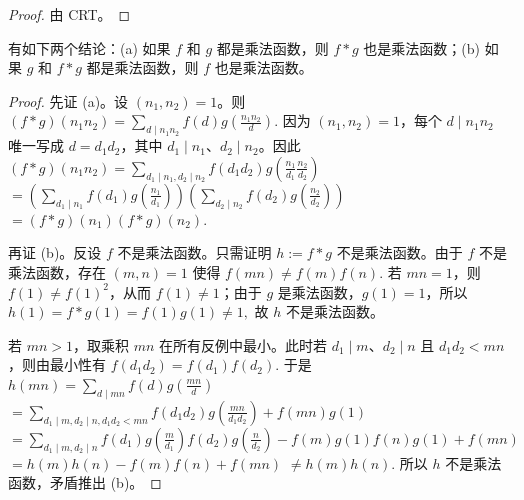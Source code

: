 \begin{proof}
	由 CRT。
\end{proof}



\begin{theorem}
	有如下两个结论：(a) 如果 $f$ 和 $g$ 都是乘法函数，则 $f*g$ 也是乘法函数；(b) 如果 $g$ 和 $f*g$ 都是乘法函数，则 $f$ 也是乘法函数。
\end{theorem}

\begin{proof}
	先证 (a)。设 $(n_1,n_2)=1$。则
	\(\textstyle (f*g)(n_1n_2) =\allowbreak{} \sum_{d\mid\allowbreak{} n_1n_2}f(d)g\left(\frac{n_1n_2}{d}\right).\)
	因为 $(n_1,n_2)=1$，每个 $d\mid n_1n_2$ 唯一写成 $d=d_1d_2$，其中 $d_1\mid n_1$、$d_2\mid n_2$。因此
	\(\textstyle (f*g)(n_1n_2) =\allowbreak{} \sum_{d_1\mid\allowbreak{} n_1,\allowbreak{} d_2\mid\allowbreak{} n_2} f(d_1d_2)g\left(\frac{n_1}{d_1}\frac{n_2}{d_2}\right)\) \(\textstyle =\allowbreak{} \left(\sum_{d_1\mid\allowbreak{} n_1}f(d_1)g\left(\frac{n_1}{d_1}\right)\right) \left(\sum_{d_2\mid\allowbreak{} n_2}f(d_2)g\left(\frac{n_2}{d_2}\right)\right)\) \(\textstyle =\allowbreak{}(f*g)(n_1)(f*g)(n_2).\)

	再证 (b)。反设 $f$ 不是乘法函数。只需证明 $h:=f*g$ 不是乘法函数。由于 $f$ 不是乘法函数，存在 $(m,n)=1$ 使得
	\(\textstyle f(mn)\neq\allowbreak{} f(m)f(n).\)
	若 $mn=1$，则 $f(1)\neq f(1)^2$，从而 $f(1)\neq 1$；由于 $g$ 是乘法函数，$g(1)=1$，所以
	\(\textstyle h(1)=\allowbreak{}f*g(1)=\allowbreak{}f(1)g(1)\neq\allowbreak{} 1,\allowbreak{}\)
	故 $h$ 不是乘法函数。

	若 $mn>1$，取乘积 $mn$ 在所有反例中最小。此时若 $d_1\mid m$、$d_2\mid n$ 且 $d_1d_2<mn$，则由最小性有
	\(\textstyle f(d_1d_2)=\allowbreak{}f(d_1)f(d_2).\)
	于是
	\(\textstyle h(mn) =\allowbreak{} \sum_{d\mid\allowbreak{} mn}f(d)g\left(\frac{mn}{d}\right)\) \(\textstyle =\allowbreak{} \sum_{d_1\mid\allowbreak{} m,\allowbreak{} d_2\mid\allowbreak{} n,\allowbreak{} d_1d_2<mn} f(d_1d_2) g\left(\frac{mn}{d_1d_2}\right) +\allowbreak{} f(mn)g(1)\) \(\textstyle =\allowbreak{} \sum_{d_1\mid\allowbreak{} m,\allowbreak{} d_2\mid\allowbreak{} n} f(d_1)g\left(\frac m{d_1}\right) f(d_2)g\left(\frac n{d_2}\right) - f(m)g(1)f(n)g(1) +\allowbreak{} f(mn)\) \(\textstyle =\allowbreak{} h(m)h(n)-f(m)f(n)+\allowbreak{}f(mn)\) \(\textstyle \neq\allowbreak{} h(m)h(n).\)
	所以 $h$ 不是乘法函数，矛盾推出 (b)。
\end{proof}

